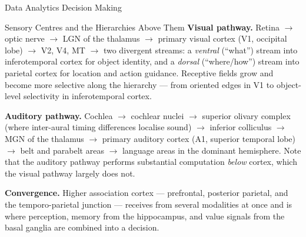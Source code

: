 \begin{v3topic}{Data Analytics Decision Making}
\begin{v3topic}{Sensory Centres and the Hierarchies Above Them}
        \textbf{Visual pathway.} Retina $\to$ optic nerve $\to$ LGN of the
        thalamus $\to$ primary visual cortex (V1, occipital lobe) $\to$
        V2, V4, MT $\to$ two divergent streams: a \emph{ventral} (``what'')
        stream into inferotemporal cortex for object identity, and a
        \emph{dorsal} (``where/how'') stream into parietal cortex for
        location and action guidance. Receptive fields grow and become more
        selective along the hierarchy --- from oriented edges in V1 to
        object-level selectivity in inferotemporal cortex.

        \textbf{Auditory pathway.} Cochlea $\to$ cochlear nuclei $\to$
        superior olivary complex (where inter-aural timing differences
        localise sound) $\to$ inferior colliculus $\to$ MGN of the thalamus
        $\to$ primary auditory cortex (A1, superior temporal lobe) $\to$
        belt and parabelt areas $\to$ language areas in the dominant
        hemisphere. Note that the auditory pathway performs substantial
        computation \emph{below} cortex, which the visual pathway largely
        does not.

        \textbf{Convergence.} Higher association cortex --- prefrontal,
        posterior parietal, and the temporo-parietal junction --- receives
        from several modalities at once and is where perception, memory from
        the hippocampus, and value signals from the basal ganglia are
        combined into a decision.

\begin{figure}[htbp]
\centering
{}
\end{figure}
\end{v3topic}
\end{v3topic}
